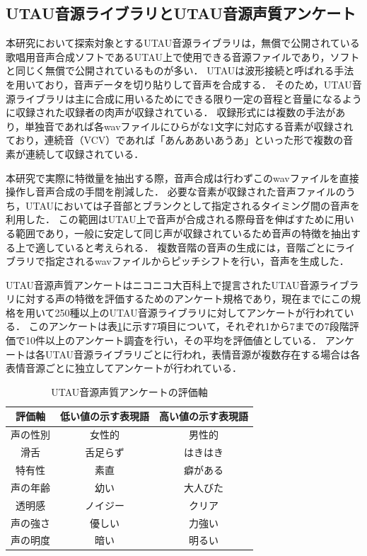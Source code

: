 \documentclass[a4j,8pt,twocolumn]{extarticle}
\begin{document}
\subsection{UTAU音源ライブラリとUTAU音源声質アンケート}
本研究において探索対象とするUTAU音源ライブラリは，無償で公開されている歌唱用音声合成ソフトであるUTAU上で使用できる音源ファイルであり，ソフトと同じく無償で公開されているものが多い．
UTAUは波形接続と呼ばれる手法を用いており，音声データを切り貼りして音声を合成する．
そのため，UTAU音源ライブラリは主に合成に用いるためにできる限り一定の音程と音量になるように収録された収録者の肉声が収録されている．
収録形式には複数の手法があり，単独音であれば各wavファイルにひらがな1文字に対応する音素が収録されており，連続音（VCV）であれば「あんああいあうあ」\cite{tatsu3shiki}といった形で複数の音素が連続して収録されている．

本研究で実際に特徴量を抽出する際，音声合成は行わずこのwavファイルを直接操作し音声合成の手間を削減した．
必要な音素が収録された音声ファイルのうち，UTAUにおいては子音部とブランクとして指定されるタイミング間の音声を利用した．
この範囲はUTAU上で音声が合成される際母音を伸ばすために用いる範囲であり，一般に安定して同じ声が収録されているため音声の特徴を抽出する上で適していると考えられる．
複数音階の音声の生成には，音階ごとにライブラリで指定されるwavファイルからピッチシフトを行い，音声を生成した．

UTAU音源声質アンケートはニコニコ大百科上で提言されたUTAU音源ライブラリに対する声の特徴を評価するためのアンケート規格であり，現在までにこの規格を用いて250種以上のUTAU音源ライブラリに対してアンケートが行われている．
このアンケートは表\ref{tab:survey}に示す7項目について，それぞれ1から7までの7段階評価で10件以上のアンケート調査を行い，その平均を評価値としている．
アンケートは各UTAU音源ライブラリごとに行われ，表情音源が複数存在する場合は各表情音源ごとに独立してアンケートが行われている．

\begin{table}[htb]
  \centering
  \caption{UTAU音源声質アンケートの評価軸}
  \label{tab:survey}
  \begin{tabular}{c|cc}
    \hline
    評価軸 & 低い値の示す表現語 & 高い値の示す表現語 \\
    \hline
    声の性別 & 女性的 & 男性的 \\
    滑舌 & 舌足らず & はきはき \\
    特有性 & 素直 & 癖がある \\
    声の年齢 & 幼い & 大人びた \\
    透明感 & ノイジー & クリア \\
    声の強さ & 優しい & 力強い \\
    声の明度 & 暗い & 明るい \\
    \hline
  \end{tabular}
\end{table}
\end{document}
